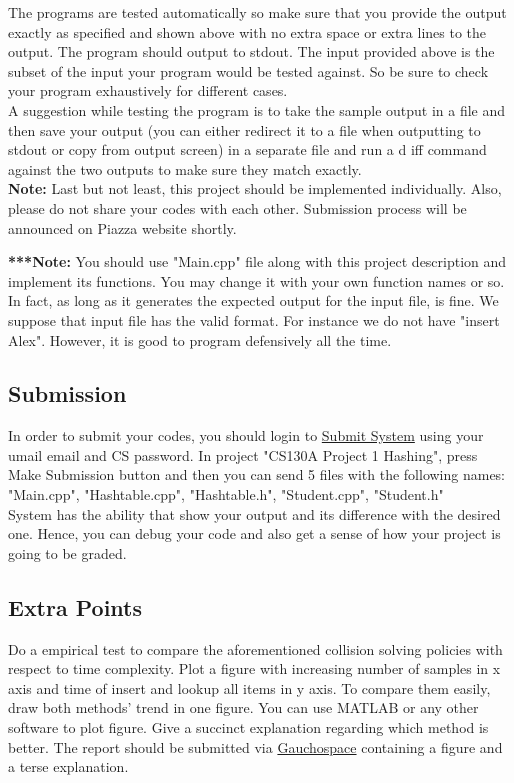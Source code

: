 \documentclass[times, 12pt]{article}
\begin{document}
The programs are tested automatically so make sure that you provide the output exactly as specified and shown above with no extra space or extra lines to the output. The program should output to stdout. The input provided above is the subset of the input your program would be
tested against. So be sure to check your program exhaustively for different cases.\\

A suggestion while testing the program is to take the sample output in a file and then save your output (you can either redirect it to a file when outputting to stdout or copy
from output screen) in a separate file and run a d	iff command against the two outputs to make sure they match exactly.\\

\textbf{Note:} Last but not least, this project should be implemented individually. Also, please do not share your codes with each other. Submission process will be announced on Piazza website shortly.

\textbf{***Note:} You should use "Main.cpp" file along with this project description and implement its functions. You may change it with your own function names or so. In fact, as long as it generates the expected output for the input file, is fine. We suppose that input file has the valid format. For instance we do not have "insert Alex". However, it is good to program defensively all the time.\\

\subsection*{Submission}
In order to submit your codes, you should login to \href{https://submit.cs.ucsb.edu/}{Submit System} using your umail email and CS password. In project "CS130A Project 1 Hashing", press Make Submission button and then you can send 5 files with the following names:\\
"Main.cpp", "Hashtable.cpp", "Hashtable.h", "Student.cpp", "Student.h"\\
System has the ability that show your output and its difference with the desired one. Hence, you can debug your code and also get a sense of how your project is going to be graded.\\

\subsection*{Extra Points}
Do a empirical test to compare the aforementioned collision solving policies with respect to time complexity. Plot a figure with increasing number of samples in x axis and time of insert and lookup all items in y axis. To compare them easily, draw both methods' trend in one figure. You can use MATLAB or any other software to plot figure. Give a succinct explanation regarding which method is better. The report should be submitted via \href{https://gauchospace.ucsb.edu/courses/mod/assign/view.php?id=515121}{Gauchospace} containing a figure and a terse explanation.
\end{document}
